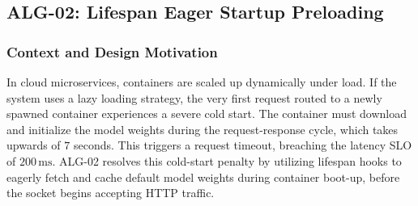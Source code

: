 \documentclass[11pt,a4paper]{article}
\theoremstyle{plain}
\theoremstyle{definition}
\theoremstyle{remark}
\begin{document}
\subsection{ALG-02: Lifespan Eager Startup Preloading}
\label{subsec:alg02}

\subsubsection{Context and Design Motivation}
In cloud microservices, containers are scaled up dynamically under load. If the system uses a lazy loading strategy, the very first request routed to a newly spawned container experiences a severe cold start. The container must download and initialize the model weights during the request-response cycle, which takes upwards of $7$ seconds. This triggers a request timeout, breaching the latency SLO of $200\,\mathrm{ms}$.
ALG-02 resolves this cold-start penalty by utilizing lifespan hooks to eagerly fetch and cache default model weights during container boot-up, before the socket begins accepting HTTP traffic.

\begin{algorithm}[H]
\caption{\textbf{ALG-02}: Lifespan Eager Startup Preloading}
\label{alg:eager-preload}
\BlankLine
{}
\end{algorithm}
\end{document}
